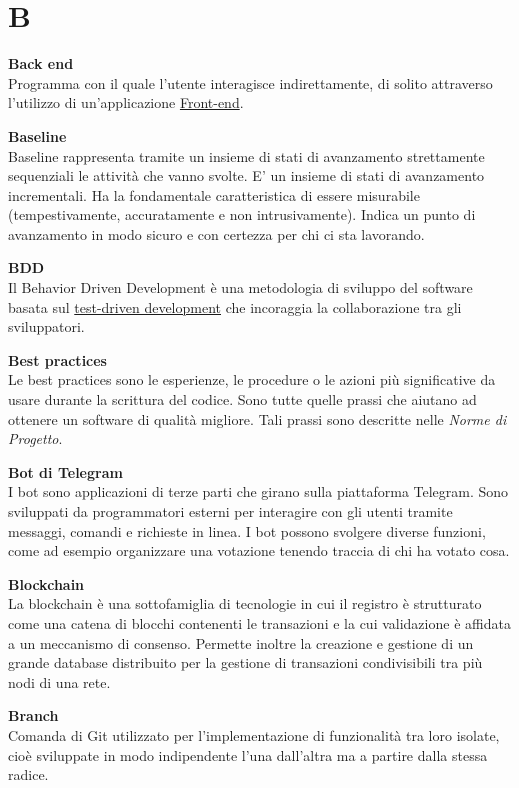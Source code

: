 \documentclass[a4paper, oneside, openany, dvipsnames, table, 12pt]{article}
\begin{document}
\newpage
\section{B}
\textbf{Back end} \\
Programma con il quale l’utente interagisce indirettamente, di solito attraverso l’utilizzo di un’applicazione \hyperref[par:frontend]{Front-end}.

\textbf{Baseline} \\
Baseline rappresenta tramite un insieme di stati di avanzamento
strettamente sequenziali le attività che vanno svolte. E’ un insieme di stati di avanzamento incrementali. Ha la fondamentale caratteristica di essere misurabile (tempestivamente, accuratamente e non intrusivamente). Indica un punto di avanzamento in modo sicuro e con certezza per chi ci sta lavorando.

\textbf{BDD} \\
Il Behavior Driven Development è una metodologia di sviluppo del software basata sul \hyperref[par:tdd]{test-driven development} che incoraggia la collaborazione tra gli sviluppatori.

\textbf{Best practices} \\
Le best practices sono le esperienze, le procedure o le azioni più significative da usare durante la scrittura del codice. Sono tutte quelle prassi che aiutano ad ottenere un software di qualità migliore. Tali prassi sono descritte nelle \textit{Norme di Progetto}.

\textbf{Bot di Telegram} \\
I bot sono applicazioni di terze parti che girano sulla piattaforma Telegram. Sono sviluppati da programmatori esterni per interagire con gli utenti tramite messaggi, comandi e richieste in linea. I bot possono svolgere diverse funzioni, come ad esempio organizzare una votazione tenendo traccia di chi ha votato cosa.

\label{par:blockC}
\textbf{Blockchain} \\
La blockchain è una sottofamiglia di tecnologie in cui il registro è strutturato come una catena di blocchi contenenti le transazioni e la cui validazione è affidata a un meccanismo di consenso. 
Permette inoltre la creazione e gestione di un grande database distribuito per la gestione di transazioni condivisibili tra più nodi di una rete. 

\textbf{Branch} \\
Comanda di Git utilizzato per l’implementazione di funzionalità tra loro isolate, cioè sviluppate in modo indipendente l’una dall’altra ma a partire dalla stessa radice.
\end{document}
